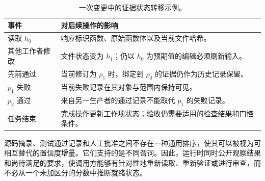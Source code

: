 \begin{table}[t]
\small
\caption{一次变更中的证据状态转移示例。}
\label{tab:trace}
\begin{tabularx}{\columnwidth}{@{}p{}X@{}}
\toprule
事件 & 对后续操作的影响\\
\midrule
读取 $h_0$ & 响应标识函数、原始函数体以及当前文件哈希。\\
其他工作者修改 & 文件状态变为 $h_1$；仍以 $h_0$ 为预期值的编辑必须刷新输入。\\
先前通过 & 当前修订为 $\rho_1$ 时，绑定到 $\rho_0$ 的证据仍作为历史记录保留。\\
$p_1$ 失败 & 当前失败记录在其对象与范围内保持可见。\\
$p_2$ 通过 & 来自另一生产者的通过记录不能取代 $p_1$ 的失败记录。\\
任务结束 & 完成操作更新工作项状态；验收仍需要适用的检查结果和门控条件。\\
\bottomrule
\end{tabularx}
\end{table}

源码摘录、测试通过记录和人工批准之间不存在一种通用排序，使其可以被视为可相互替代的置信度增量。它们支持的是不同谓词。因此，运行时同时公开观察结果和尚待满足的要求，使调用方能够有针对性地重新读取、重新验证或进行审查，而不必从一个未加区分的分数中推断就绪状态。
